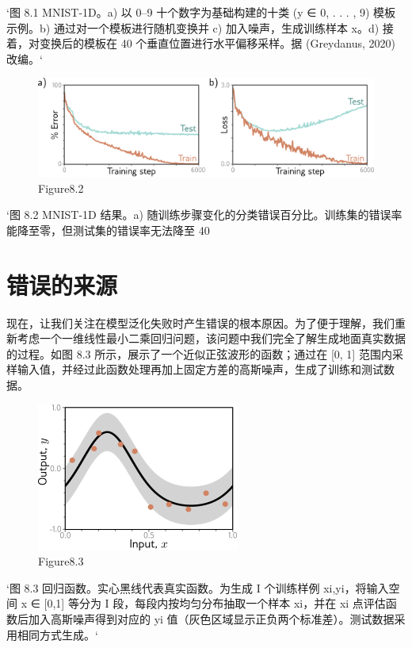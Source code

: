 `图 8.1 MNIST-1D。a) 以 0–9 十个数字为基础构建的十类 (y ∈ {0, . . . , 9}) 模板示例。b) 通过对一个模板进行随机变换并 c) 加入噪声，生成训练样本 x。d) 接着，对变换后的模板在 40 个垂直位置进行水平偏移采样。据 (Greydanus, 2020) 改编。`

\begin{figure}[h!]
\centering
\includegraphics[width=0.7\linewidth]{png/chapter8/PerfMNIST1DResults.png}
\caption{Figure8.2}
\end{figure}

`图 8.2 MNIST-1D 结果。a) 随训练步骤变化的分类错误百分比。训练集的错误率能降至零，但测试集的错误率无法降至 40%
\section{错误的来源}
现在，让我们关注在模型泛化失败时产生错误的根本原因。为了便于理解，我们重新考虑一个一维线性最小二乘回归问题，该问题中我们完全了解生成地面真实数据的过程。如图 8.3 所示，展示了一个近似正弦波形的函数；通过在 [0, 1] 范围内采样输入值，并经过此函数处理再加上固定方差的高斯噪声，生成了训练和测试数据。

\begin{figure}[h!]
\centering
\includegraphics[width=0.7\linewidth]{png/chapter8/PerfDataSet.png}
\caption{Figure8.3}
\end{figure}

`图 8.3 回归函数。实心黑线代表真实函数。为生成 I 个训练样例 {xi,yi}，将输入空间 x ∈ [0,1] 等分为 I 段，每段内按均匀分布抽取一个样本 xi，并在 xi 点评估函数后加入高斯噪声得到对应的 yi 值（灰色区域显示正负两个标准差）。测试数据采用相同方式生成。`

